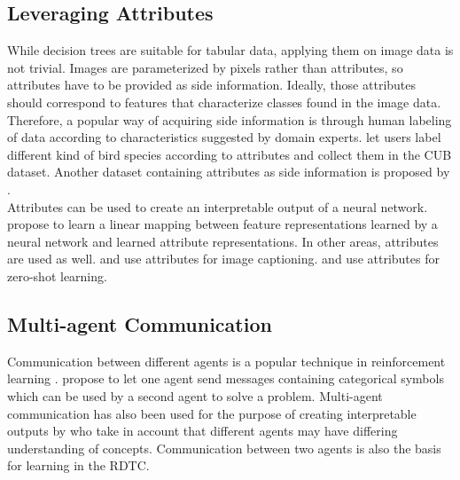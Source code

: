 \documentclass[a4paper,cleardoubleempty,BCOR1cm, 11pt]{report}
\begin{document}
\subsection{Leveraging Attributes}
While decision trees are suitable for tabular data, applying them on image data is not trivial. Images are parameterized by pixels rather than attributes, so attributes have to be provided as side information. Ideally, those attributes should correspond to features that characterize classes found in the image data. Therefore, a popular way of acquiring side information is through human labeling of data according to characteristics suggested by domain experts. \citet{WahCUB_200_2011} let users label different kind of bird species according to attributes and collect them in the CUB dataset. Another dataset containing attributes as side information is proposed by \citet{8413121}.\\
Attributes can be used to create an interpretable output of a neural network. \citet{akata2013label} propose to learn a linear mapping between feature representations learned by a neural network and learned attribute representations.
In other areas, attributes are used as well. \citet{kulkarni2013babytalk} and \citet{ordonez2011im2text} use attributes for image captioning. \citet{lampert2009learning} and \citet{palatucci2009zero} use attributes for zero-shot learning.


\subsection{Multi-agent Communication}
Communication between different agents is a popular technique in reinforcement learning \cite{havrylov2017emergence, lazaridou2018emergence, cao2018emergent, jiang2018learning, das2019tarmac}. \citet{foerster2016learning} propose to let one agent send messages containing categorical symbols which can be used by a second agent to solve a problem. Multi-agent communication has also been used for the purpose of creating interpretable outputs by \citet{rodriguez2019modeling} who take in account that different agents may have differing understanding of concepts. Communication between two agents is also the basis for learning in the RDTC.
\end{document}
